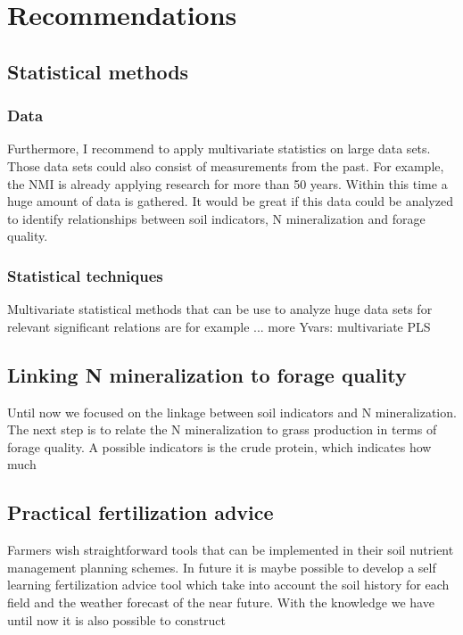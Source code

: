 \documentclass[10pt,twoside,dutch,english]{report}
\begin{document}
\chapter{Recommendations}

	 \section{Statistical methods}

	 \subsection{Data}
Furthermore, I recommend to apply multivariate statistics on large data sets. Those data sets could also consist of measurements from the past. For example, the NMI is already applying research for more than 50 years. Within this time a huge amount of data is gathered. It would be great if this data could be analyzed to identify relationships between soil indicators, N mineralization and forage quality. 
	\subsection{Statistical techniques}
	Multivariate statistical methods that can be use to analyze huge data sets for relevant significant relations are for example ...
    more Yvars: multivariate PLS

	\section{Linking N mineralization to forage quality}
Until now we focused on the linkage between soil indicators and N mineralization. The next step is to relate the N mineralization to grass production in terms of forage quality. A possible indicators is the crude protein, which indicates how much 


	
	\section{Practical fertilization advice}
	Farmers wish straightforward tools that can be implemented in their soil nutrient management planning schemes. In future it is maybe possible to develop a self learning fertilization advice tool which take into account the soil history for each field and the weather forecast of the near future. With the knowledge we have until now it is also possible to construct
    
\end{document}
